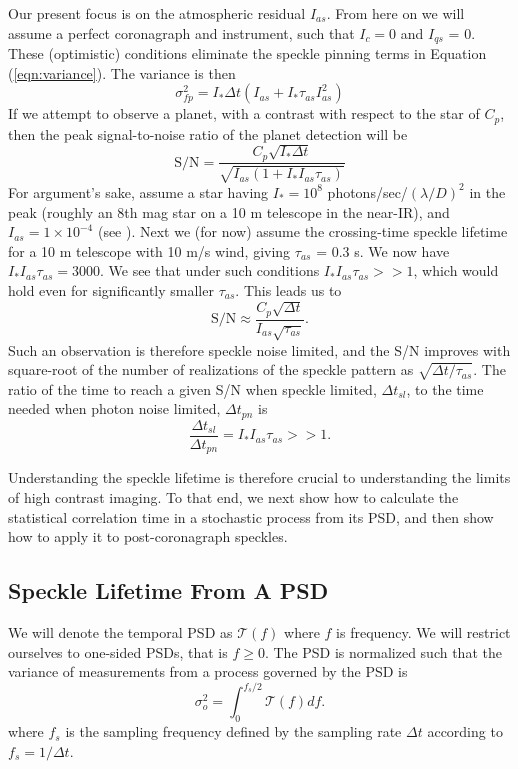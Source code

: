 \documentclass[10pt,preprint]{aastex631}
\begin{document}
Our present focus is on the atmospheric residual $I_{as}$.  From here on we will assume a perfect coronagraph and instrument, such that $I_c = 0$ and $I_{qs}$ = 0.  These (optimistic) conditions eliminate the speckle pinning \citep{2001ApJ...558L..71B} terms in Equation (\ref{eqn:variance}).  The variance is then
\begin{equation}
\sigma^2_{fp}  = I_* \Delta t \left(I_{as} + I_* \tau_{as} I_{as}^2 \right)
\label{eqn:variance_as}
\end{equation}
If we attempt to observe a planet, with a contrast with respect to the star of $C_p$, then the peak signal-to-noise ratio of the planet detection will be
\begin{equation}
\mbox{S/N} = \frac{C_p \sqrt{I_* \Delta t}}{ \sqrt{I_{as} (1 + I_*I_{as} \tau_{as})}} 
\end{equation}
For argument's sake, assume a star having $I_* = 10^8$ photons/sec/$(\lambda/D)^2$ in the peak (roughly an 8th mag star on a 10 m telescope in the near-IR), and $I_{as} = 1\times10^{-4}$ (see \citet{2018JATIS...4a9001M}).  Next we (for now) assume the \citet{2005SPIE.5903..170M} crossing-time speckle lifetime for a 10 m telescope with 10 m/s wind, giving $\tau_{as}$ = 0.3 s.  We now have $I_*I_{as} \tau_{as} = 3000$.  We see that under such conditions  $I_*I_{as} \tau_{as} >> 1$, which would hold even for significantly smaller $\tau_{as}$.  This leads us to
\begin{equation}
\mbox{S/N} \approx \frac{C_p \sqrt{\Delta t}}{ I_{as} \sqrt{\tau_{as}}}. 
\end{equation}
Such an observation is therefore speckle noise limited, and the S/N improves with square-root of the number of realizations of the speckle pattern as $\sqrt{\Delta t/ \tau_{as}}$.  The ratio of the time to reach a given S/N when speckle limited, $\Delta t_{sl}$, to the time needed when photon noise limited, $\Delta t_{pn}$ is
\begin{equation}
\frac{\Delta t_{sl}}{\Delta t_{pn}} = I_*I_{as} \tau_{as} >> 1.
\label{eqn:relexptime}
\end{equation}

Understanding the speckle lifetime is therefore crucial to understanding the limits of high contrast imaging.  To that end, we next show how to calculate the statistical correlation time in a stochastic process from its PSD, and then show how to apply it to post-coronagraph speckles.


\subsection{Speckle Lifetime From A PSD}
\label{sec:psd_lifetime}
We will denote the temporal PSD as $\mathcal{T}(f)$ where $f$ is frequency.  We will restrict ourselves to one-sided PSDs, that is $f \ge 0$.  The PSD is normalized such that the variance of measurements from a process governed by the PSD is
\begin{equation}
\sigma_o^2 = \int_{0}^{f_s/2} \mathcal{T}(f) df.
\label{eqn:process_var}
\end{equation}
where $f_s$ is the sampling frequency defined by the sampling rate $\Delta t$ according to $f_s = 1/\Delta t$.
\end{document}

